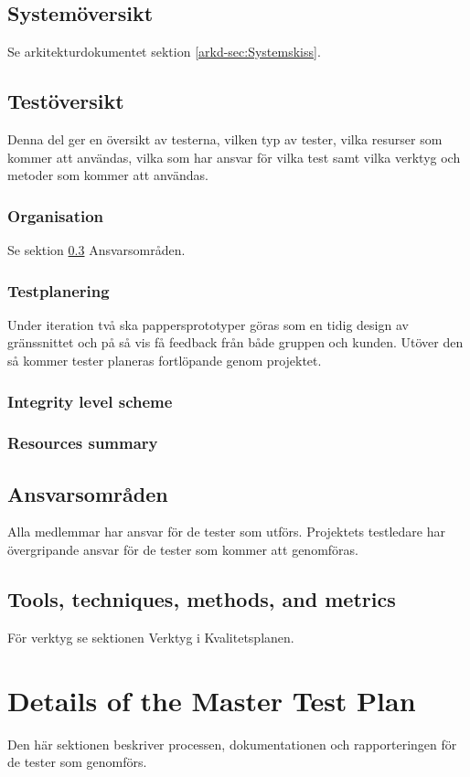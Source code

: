\documentclass[a4paper,10pt]{article}
\begin{document}
\subsection{Systemöversikt}
Se arkitekturdokumentet sektion \ref{arkd-sec:Systemskiss}.

\subsection{Testöversikt}
Denna del ger en översikt av testerna, vilken typ av tester, vilka resurser som kommer att användas, vilka som har ansvar för vilka test samt vilka verktyg och metoder som kommer att användas.

\subsubsection{Organisation}
Se sektion \ref{sec:Ansvarsomraden} Ansvarsområden.

\subsubsection{Testplanering}
Under iteration två ska pappersprototyper göras som en tidig design av gränssnittet och på så vis få feedback från både gruppen och kunden. Utöver den så kommer tester planeras fortlöpande genom projektet.

\subsubsection{Integrity level scheme}
\subsubsection{Resources summary}
\subsection{Ansvarsområden}
\label{sec:Ansvarsomraden}
Alla medlemmar har ansvar för de tester som utförs. Projektets testledare har övergripande ansvar för de tester som kommer att genomföras.
\subsection{Tools, techniques, methods, and metrics}
För verktyg se sektionen Verktyg i Kvalitetsplanen.
\section{Details of the Master Test Plan}
Den här sektionen beskriver processen, dokumentationen och rapporteringen för de tester som genomförs.
\end{document}

